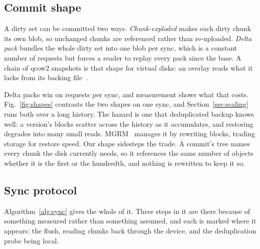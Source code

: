 \documentclass[journal,10pt]{IEEEtran}
\begin{document}
\subsection{Commit shape}

A dirty set can be committed two ways. \emph{Chunk-exploded} makes each dirty
chunk its own blob, so unchanged chunks are referenced rather than re-uploaded.
\emph{Delta pack} bundles the whole dirty set into one blob per sync, which is a
constant number of requests but forces a reader to replay every pack since the
base. A chain of qcow2 snapshots is that shape for virtual disks: an overlay
reads what it lacks from its backing file~\cite{qcow2}.

Delta packs win on requests per sync, and measurement shows what that costs.
Fig.~\ref{fig:shapes} contrasts the two shapes on one sync, and
Section~\ref{sec:scaling} runs both over a long history. The hazard is one that
deduplicated backup knows well: a version's blocks scatter across the history
as it accumulates, and restoring degrades into many small reads.
MGRM~\cite{mgrm} manages it by rewriting blocks, trading storage for restore
speed. Our shape sidesteps the trade. A commit's tree names every chunk the disk
currently needs, so it references the same number of objects whether it is the
first or the hundredth, and nothing is rewritten to keep it so.

\subsection{Sync protocol}
\label{sec:sync}

Algorithm~\ref{alg:sync} gives the whole of it. Three steps in it are there
because of something measured rather than something assumed, and each is marked
where it appears: the flush, reading chunks back through the device, and the
deduplication probe being local.
\end{document}

